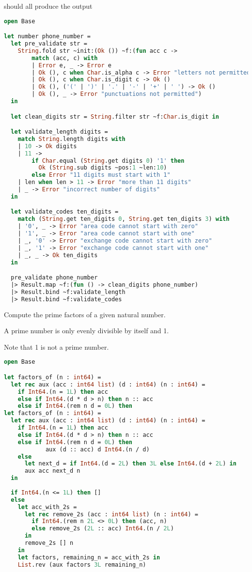 should all produce the output


\begin{lstlisting}[language=OCaml]
open Base

let number phone_number =
  let pre_validate str =
    String.fold str ~init:(Ok ()) ~f:(fun acc c ->
        match (acc, c) with
        | Error e, _ -> Error e
        | Ok (), c when Char.is_alpha c -> Error "letters not permitted"
        | Ok (), c when Char.is_digit c -> Ok ()
        | Ok (), ('(' | ')' | '.' | '-' | '+' | ' ') -> Ok ()
        | Ok (), _ -> Error "punctuations not permitted")
  in

  let clean_digits str = String.filter str ~f:Char.is_digit in

  let validate_length digits =
    match String.length digits with
    | 10 -> Ok digits
    | 11 ->
        if Char.equal (String.get digits 0) '1' then
          Ok (String.sub digits ~pos:1 ~len:10)
        else Error "11 digits must start with 1"
    | len when len > 11 -> Error "more than 11 digits"
    | _ -> Error "incorrect number of digits"
  in

  let validate_codes ten_digits =
    match (String.get ten_digits 0, String.get ten_digits 3) with
    | '0', _ -> Error "area code cannot start with zero"
    | '1', _ -> Error "area code cannot start with one"
    | _, '0' -> Error "exchange code cannot start with zero"
    | _, '1' -> Error "exchange code cannot start with one"
    | _, _ -> Ok ten_digits
  in

  pre_validate phone_number
  |> Result.map ~f:(fun () -> clean_digits phone_number)
  |> Result.bind ~f:validate_length
  |> Result.bind ~f:validate_codes
\end{lstlisting}

Compute the prime factors of a given natural number.

A prime number is only evenly divisible by itself and 1.

Note that 1 is not a prime number.

\begin{lstlisting}[language=OCaml]
open Base

let factors_of (n : int64) =
  let rec aux (acc : int64 list) (d : int64) (n : int64) =
    if Int64.(n = 1L) then acc
    else if Int64.(d * d > n) then n :: acc
    else if Int64.(rem n d = 0L) then
let factors_of (n : int64) =
  let rec aux (acc : int64 list) (d : int64) (n : int64) =
    if Int64.(n = 1L) then acc
    else if Int64.(d * d > n) then n :: acc
    else if Int64.(rem n d = 0L) then
            aux (d :: acc) d Int64.(n / d)
    else
      let next_d = if Int64.(d = 2L) then 3L else Int64.(d + 2L) in
      aux acc next_d n
  in
  
  if Int64.(n <= 1L) then []
  else
    let acc_with_2s =
      let rec remove_2s (acc : int64 list) (n : int64) =
        if Int64.(rem n 2L <> 0L) then (acc, n)
        else remove_2s (2L :: acc) Int64.(n / 2L)
      in
      remove_2s [] n
    in
    let factors, remaining_n = acc_with_2s in
    List.rev (aux factors 3L remaining_n)
\end{lstlisting}

